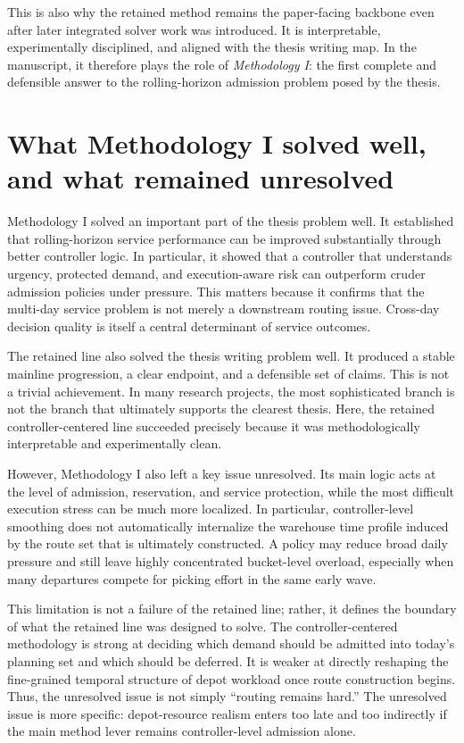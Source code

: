 This is also why the retained method remains the paper-facing backbone even after later integrated solver work was introduced. It is interpretable, experimentally disciplined, and aligned with the thesis writing map. In the manuscript, it therefore plays the role of \emph{Methodology I}: the first complete and defensible answer to the rolling-horizon admission problem posed by the thesis.

\section{What Methodology I solved well, and what remained unresolved}

Methodology I solved an important part of the thesis problem well. It established that rolling-horizon service performance can be improved substantially through better controller logic. In particular, it showed that a controller that understands urgency, protected demand, and execution-aware risk can outperform cruder admission policies under pressure. This matters because it confirms that the multi-day service problem is not merely a downstream routing issue. Cross-day decision quality is itself a central determinant of service outcomes.

The retained line also solved the thesis writing problem well. It produced a stable mainline progression, a clear endpoint, and a defensible set of claims. This is not a trivial achievement. In many research projects, the most sophisticated branch is not the branch that ultimately supports the clearest thesis. Here, the retained controller-centered line succeeded precisely because it was methodologically interpretable and experimentally clean.

However, Methodology I also left a key issue unresolved. Its main logic acts at the level of admission, reservation, and service protection, while the most difficult execution stress can be much more localized. In particular, controller-level smoothing does not automatically internalize the warehouse time profile induced by the route set that is ultimately constructed. A policy may reduce broad daily pressure and still leave highly concentrated bucket-level overload, especially when many departures compete for picking effort in the same early wave.

This limitation is not a failure of the retained line; rather, it defines the boundary of what the retained line was designed to solve. The controller-centered methodology is strong at deciding which demand should be admitted into today's planning set and which should be deferred. It is weaker at directly reshaping the fine-grained temporal structure of depot workload once route construction begins. Thus, the unresolved issue is not simply ``routing remains hard.'' The unresolved issue is more specific: depot-resource realism enters too late and too indirectly if the main method lever remains controller-level admission alone.

